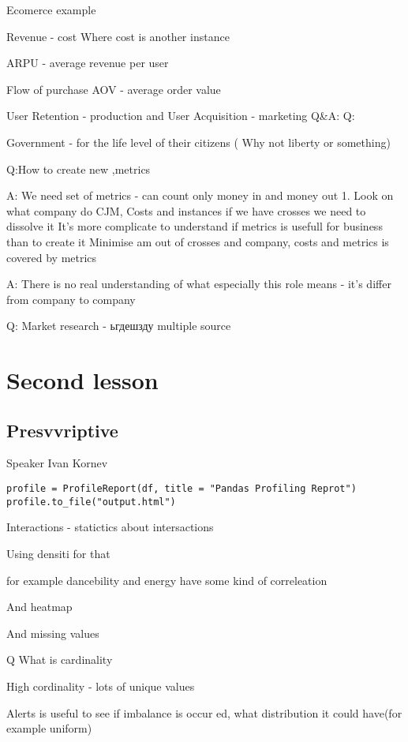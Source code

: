 \documentclass[12pt, a4paper, oneside]{article}
\begin{document}
Ecomerce example

Revenue - cost Where cost is another instance

ARPU - average revenue per user 

Flow of purchase 
AOV - average order value 

User Retention - production and 
User Acquisition - marketing 
Q&A:
Q: 

Government - for the life level of their citizens ( Why not liberty or something)

Q:How to create new ,metrics

A: We need set of metrics - can count only money in and money out
1. Look on what company do
CJM, Costs and instances if we have crosses we need to dissolve it 
 It's more complicate to understand if metrics is usefull for business than to create it 
 Minimise am out of crosses and company, costs and metrics  is covered by metrics

 A: 
 There is no real understanding of what especially this role means - it's differ from company to company

 Q: Market research  - ьгдешзду multiple source

\section{Second lesson}

\subsection{Presvvriptive}

Speaker Ivan Kornev


\begin{lstlisting}
profile = ProfileReport(df, title = "Pandas Profiling Reprot")
profile.to_file("output.html")
\end{lstlisting}



 Interactions - statictics about intersactions 

 Using densiti for that 

 for example dancebility and energy have some kind of correleation 


And heatmap

 And missing values 

 Q What is cardinality 

 High cordinality - lots of unique values 

 Alerts is useful to see if imbalance is occur ed, what distribution it could have(for example uniform) 
\end{document}
